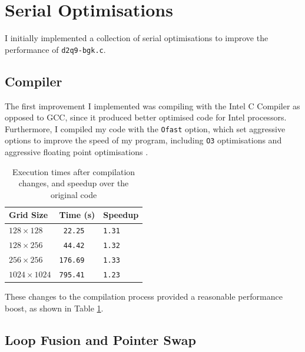 \documentclass[11pt, twocolumn, a4paper]{article}
\begin{document}
\section{Serial Optimisations}

I initially implemented a collection of serial optimisations to improve the performance of \texttt{d2q9-bgk.c}.

\subsection{Compiler}

The first improvement I implemented was compiling with the Intel C Compiler as opposed to GCC, since it produced better optimised code for Intel processors.
Furthermore, I compiled my code with the \texttt{Ofast} option, which set aggressive options to improve the speed of my program, including \texttt{O3} optimisations and aggressive floating point optimisations \cite{icc}.

\begin{table}[htbp]
  \begin{center}
  \caption{Execution times after compilation changes, and speedup over the original code}\label{tab:compiler_changes}
  \begin{tabular}{l | l l} 
      \hline\hline
      Grid Size&Time (s)&Speedup\\
      \hline
      $128 \times 128$&\texttt{ 22.25}&\texttt{1.31}\\
      $128 \times 256$&\texttt{ 44.42}&\texttt{1.32}\\
      $256 \times 256$&\texttt{176.69}&\texttt{1.33}\\
      $1024 \times 1024$&\texttt{795.41}&\texttt{1.23}\\
      \hline
    \end{tabular}
  \end{center}
\end{table}

These changes to the compilation process provided a reasonable performance boost, as shown in Table \ref{tab:compiler_changes}.

\subsection{Loop Fusion and Pointer Swap}
\end{document}
